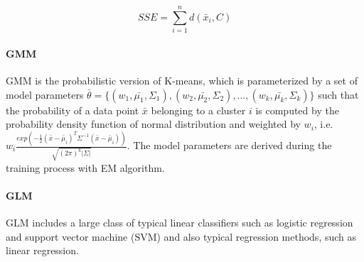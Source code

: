 \begin{equation}\label{eq: sse_k_means}
    SSE = \sum_{i=1}^nd(\bar{x}_i, C)
\end{equation}

\paragraph{GMM} GMM is the probabilistic version of K-means, which is parameterized by a set of model parameters $\bar{\theta} = \{(w_1, \bar{\mu_1}, \Sigma_1), (w_2, \bar{\mu_2}, \Sigma_2), \dots, (w_k, \bar{\mu_k}, \Sigma_k)\}$ such that the probability of a data point $\bar{x}$ belonging to a cluster $i$ is computed by the probability density function of normal distribution and weighted by $w_i$, i.e.  $w_i\frac{exp(-\frac{1}{2}(\bar{x}-\bar{\mu}_i)^T\Sigma^{-1}(\bar{x}-\bar{\mu}_i))}{\sqrt{(2\pi)^k|\Sigma|}}$. The model parameters are derived during the training process with EM algorithm.

\paragraph{GLM} GLM includes a large class of typical linear classifiers such as logistic regression and support vector machine (SVM) and also typical regression methods, such as linear regression.